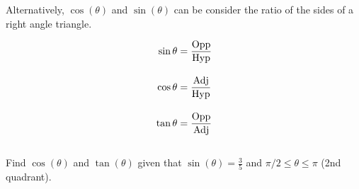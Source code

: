 \documentclass[../mathNotesPreamble]{subfiles}
\begin{document}
    \begin{defn*}
    
      Alternatively, $\cos(\theta)$ and $\sin(\theta)$ can be consider the ratio of the sides of a right angle triangle.
      
      \begin{minipage}{0.5\linewidth}
      \end{minipage}%
      \begin{minipage}{0.5\linewidth}
        \begin{align*}
          \sin\theta&=\dfrac{\textnormal{Opp}}{\textnormal{Hyp}}\\[10pt]
          \cos\theta&=\dfrac{\textnormal{Adj}}{\textnormal{Hyp}}\\[10pt]
          \tan\theta&=\dfrac{\textnormal{Opp}}{\textnormal{Adj}}\\[10pt]
        \end{align*}
      \end{minipage}
    \end{defn*}
    \begin{ex*}
      Find $\cos(\theta)$ and $\tan(\theta)$ given that $\sin(\theta)=\frac{3}{5}$ and $\pi/2\leq \theta\leq \pi$ (2nd quadrant).
    \end{ex*}
    
\end{document}
